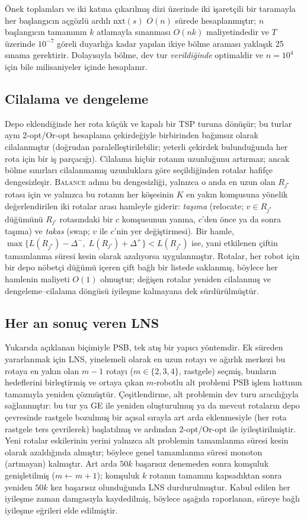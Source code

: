 Önek toplamları ve iki katına çıkarılmış dizi üzerinde iki işaretçili bir taramayla her başlangıcın
açgözlü ardılı $\mathrm{nxt}(s)$ $O(n)$ sürede hesaplanmıştır; $n$ başlangıcın tamamının
$k$ atlamayla sınanması $O(nk)$ maliyetindedir ve $T$ üzerinde $10^{-7}$ göreli duyarlığa kadar
yapılan ikiye bölme araması yaklaşık 25 sınama gerektirir. Dolayısıyla bölme, dev tur \emph{verildiğinde}
optimaldir ve $n=10^4$ için bile milisaniyeler içinde hesaplanır.

\subsection{Cilalama ve dengeleme}
Depo eklendiğinde her rota küçük ve kapalı bir TSP turuna dönüşür; bu turlar aynı 2-opt/Or-opt hesaplama çekirdeğiyle
birbirinden bağımsız olarak cilalanmıştır (doğrudan paralelleştirilebilir; yeterli çekirdek bulunduğunda her rota için
bir iş parçacığı). Cilalama hiçbir rotanın uzunluğunu artırmaz;
ancak bölme sınırları cilalanmamış uzunluklara göre seçildiğinden rotalar
hafifçe dengesizleşir. \textsc{Balance} adımı bu dengesizliği, yalnızca o anda en uzun olan $R_{j^\star}$ rotası için
ve yalnızca bu rotanın her köşesinin $K$ en yakın komşusuna yönelik değerlendirilen iki rotalar arası
hamleyle giderir: \emph{taşıma} (relocate; $v\in R_{j^\star}$ düğümünü
$R_{j'}$ rotasındaki bir $c$ komşusunun yanına, $c$'den önce ya da sonra taşıma) ve \emph{takas}
(swap; $v$ ile $c$'nin yer değiştirmesi). Bir hamle,
$\max\{L(R_{j^\star})-\Delta^-,\;L(R_{j'})+\Delta^+\}<L(R_{j^\star})$ ise, yani etkilenen
çiftin tamamlanma süresi kesin olarak azalıyorsa uygulanmıştır. Rotalar, her robot için bir depo nöbetçi
düğümü içeren çift bağlı bir listede saklanmış, böylece her hamlenin maliyeti $O(1)$ olmuştur; değişen
rotalar yeniden cilalanmış ve dengeleme--cilalama döngüsü iyileşme kalmayana dek
sürdürülmüştür.

\subsection{Her an sonuç veren LNS}
Yukarıda açıklanan biçimiyle PSB, tek atış bir yapıcı yöntemdir. Ek süreden yararlanmak için LNS,
yinelemeli olarak en uzun rotayı ve ağırlık merkezi bu rotaya en yakın olan $m-1$ rotayı
($m\in\{2,3,4\}$, rastgele) seçmiş, bunların hedeflerini birleştirmiş ve ortaya çıkan
$m$-robotlu alt problemi PSB işlem hattının tamamıyla yeniden çözmüştür. Çeşitlendirme,
alt problemin dev turu aracılığıyla sağlanmıştır: bu tur ya GE ile yeniden oluşturulmuş ya da
mevcut rotaların depo çevresinde rastgele bozulmuş bir açısal sırayla art arda eklenmesiyle
(her rota rastgele ters çevrilerek) başlatılmış ve ardından 2-opt/Or-opt ile iyileştirilmiştir. Yeni
rotalar eskilerinin yerini yalnızca alt problemin tamamlanma süresi kesin olarak azaldığında almıştır;
böylece genel tamamlanma süresi monoton (artmayan) kalmıştır. Art arda $50k$ başarısız denemeden sonra
komşuluk genişletilmiş ($m\gets m+1$); komşuluk $k$ rotanın tamamını kapsadıktan sonra
yeniden $50k$ kez başarısız olunduğunda LNS durdurulmuştur. Kabul edilen her iyileşme
zaman damgasıyla kaydedilmiş, böylece aşağıda raporlanan, süreye bağlı iyileşme eğrileri elde edilmiştir.

